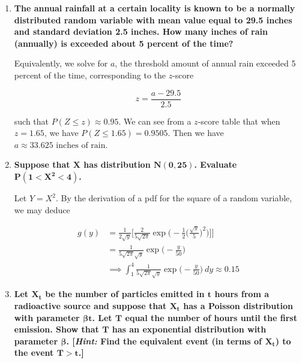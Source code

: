 \documentclass[10pt, oneside]{article}   	%
\theoremstyle{definition}
\begin{document}
\begin{enumerate}[label=9.\arabic*]
\item  \begin{tcolorbox}[
  colback=Cerulean!5!white,
  colframe=Cerulean!75!black]
\textbf{The annual rainfall at a certain locality is known to be a normally distributed random variable with mean value equal to 29.5 inches and standard deviation 2.5 inches. How many inches of rain (annually) is exceeded about 5 percent of the time?}
\end{tcolorbox}

Equivalently, we solve for $a$, the threshold amount of annual rain exceeded 5 percent of the time, corresponding to the $z$-score

\[ z = \frac{a - 29.5}{2.5} \]

such that $P(Z \leq z) \approx 0.95$. We can see from a $z$-score table that when $z = 1.65$, we have $P(Z \leq 1.65) = 0.9505$. Then we have $\boxed{ a \approx 33.625 \text{ inches of rain}}$.

\item  \begin{tcolorbox}[
  colback=Cerulean!5!white,
  colframe=Cerulean!75!black]
\textbf{Suppose that $\bm{X}$ has distribution $\bm{N(0,25)}$. Evaluate $\bm{P(1 < X^2 < 4)}$.}
\end{tcolorbox}

Let $Y = X^2$. By the derivation of a pdf for the square of a random variable, we may deduce

\begin{align*}
g(y) &= \frac{1}{2\sqrt{y}} \bigg[ \frac{2}{5\sqrt{2\pi}} \exp \bigg( -\frac{1}{2} \bigg( \frac{\sqrt{y}}{5} \bigg)^2 \bigg) \bigg] \bigg] \\
&= \frac{1}{5 \sqrt{2\pi} \sqrt{y}} \exp \bigg( -\frac{y}{50} \bigg) \\
&\implies \int^4_1 \frac{1}{5 \sqrt{2\pi} \sqrt{y}} \exp \bigg( -\frac{y}{50} \bigg) \ dy \approx \boxed{0.15}
\end{align*}

\newpage
\item  \begin{tcolorbox}[
  colback=Cerulean!5!white,
  colframe=Cerulean!75!black]
\textbf{Let $\bm{X_t}$ be the number of particles emitted in $\bm{t}$ hours from a radioactive source and suppose that $\bm{X_t}$ has a Poisson distribution with parameter $\bm{\beta t}$. Let $\bm{T}$ equal the number of hours until the first emission. Show that $\bm{T}$ has an exponential distribution with parameter $\bm{\beta}$. [\textit{Hint:} Find the equivalent event (in terms of $\bm{X_t}$) to the event $\bm{T > t}$.]}
\end{tcolorbox}


\end{enumerate}
\end{document}
